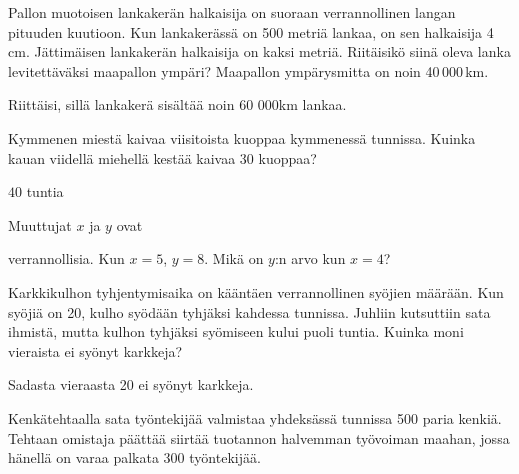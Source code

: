 \begin{tehtavasivu}
\begin{tehtava}
Pallon muotoisen lankakerän halkaisija on suoraan verrannollinen langan pituuden kuutioon. Kun lankakerässä on 500 metriä lankaa, on sen halkaisija 4 cm. Jättimäisen lankakerän halkaisija on kaksi metriä. Riitäisikö siinä oleva lanka levitettäväksi maapallon ympäri? Maapallon ympärysmitta on noin 40\,000\,km.
\begin{vastaus}
Riittäisi, sillä lankakerä sisältää noin 60 000km lankaa.
\end{vastaus}
\end{tehtava}

\begin{tehtava}
	Kymmenen miestä kaivaa viisitoista kuoppaa kymmenessä tunnissa.
	Kuinka kauan viidellä miehellä kestää kaivaa $30$ kuoppaa?	
	\begin{vastaus}
		$40$ tuntia
	\end{vastaus}
\end{tehtava}

\begin{tehtava}
	Muuttujat $x$ ja $y$ ovat
	\begin{alakohdatrivi}
	\end{alakohdatrivi}
	verrannollisia. Kun $x = 5$, $y = 8$. Mikä on $y$:n arvo kun $x = 4$?
	\begin{vastaus}
		\begin{alakohdat}
		\end{alakohdat}
	\end{vastaus}
\end{tehtava}

\begin{tehtava}
	Karkkikulhon tyhjentymisaika on kääntäen verrannollinen syöjien määrään. Kun syöjiä on 20, kulho syödään tyhjäksi kahdessa tunnissa. Juhliin kutsuttiin sata ihmistä, mutta kulhon tyhjäksi syömiseen kului puoli tuntia. Kuinka moni vieraista ei syönyt karkkeja?
	\begin{vastaus}
		Sadasta vieraasta 20 ei syönyt karkkeja.
	\end{vastaus}
\end{tehtava}

\begin{tehtava}
Kenkätehtaalla sata työntekijää valmistaa yhdeksässä tunnissa 500 paria kenkiä. Tehtaan omistaja päättää siirtää tuotannon halvemman työvoiman maahan, jossa hänellä on varaa palkata 300 työntekijää. 


\end{tehtava}
\end{tehtavasivu}
